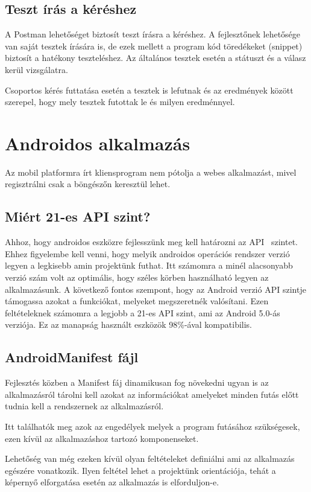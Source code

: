 \documentclass[
]{thesis-ekf}
\theoremstyle{definition}
\theoremstyle{remark}
\begin{document}
\section{Teszt írás a kéréshez}
A Postman lehetőséget biztosít teszt írásra a kéréshez. A fejlesztőnek lehetősége van saját tesztek írására is, de ezek mellett a program kód töredékeket (snippet) biztosít a hatékony teszteléshez. Az általános tesztek esetén a státuszt és a válasz kerül vizsgálatra.

Csoportos kérés futtatása esetén a tesztek is lefutnak és az eredmények között szerepel, hogy mely tesztek futottak le és milyen eredménnyel. 

\chapter{Androidos alkalmazás}
Az mobil platformra írt kliensprogram nem pótolja a webes alkalmazást, mivel regisztrálni csak a böngészőn keresztül lehet. 
\section{Miért 21-es API szint?}
Ahhoz, hogy androidos eszközre fejlesszünk meg kell határozni az API~\cite{android_api_level} szintet. Ehhez figyelembe kell venni, hogy melyik androidos operációs rendszer verzió legyen a legkisebb amin projektünk futhat. Itt számomra a minél alacsonyabb verzió szám volt az optimális, hogy széles körben használható legyen az alkalmazásunk. A következő fontos szempont, hogy az Android verzió API szintje támogassa azokat a funkciókat, melyeket megszeretnék valósítani. Ezen feltételeknek számomra a legjobb a 21-es API szint, ami az Android 5.0-ás verziója. Ez az manapság használt eszközök 98\%-ával kompatibilis.

\section{AndroidManifest fájl}
Fejlesztés közben a Manifest fáj dinamikusan fog növekedni ugyan is az alkalmazásról tárolni kell azokat az információkat amelyeket minden futás előtt tudnia kell a rendszernek az alkalmazásról.

Itt találhatók meg azok az engedélyek melyek a program futásához szükségesek, ezen kívül az alkalmazáshoz tartozó komponenseket. 

Lehetőség van még ezeken kívül olyan feltételeket definiálni ami az alkalmazás egészére vonatkozik. Ilyen feltétel lehet a projektünk orientációja, tehát a képernyő elforgatása esetén az alkalmazás is elforduljon-e.
\end{document}
